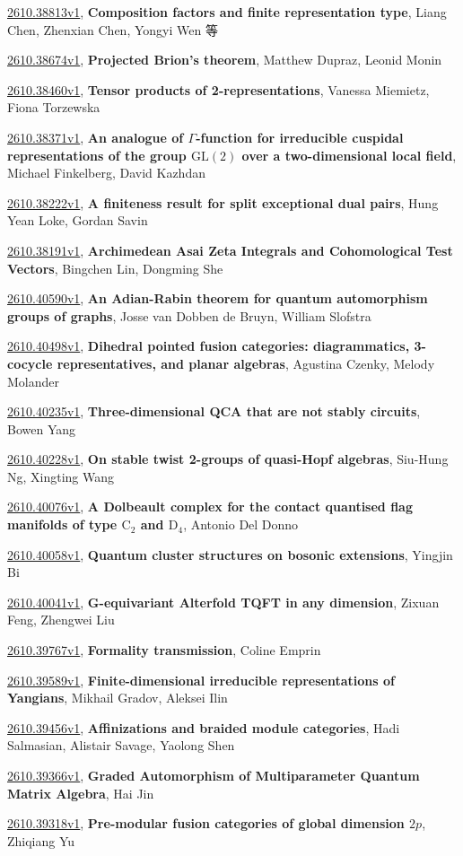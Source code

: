 \documentclass[9pt, a4paper]{article}
\theoremstyle{plain}
\theoremstyle{definition}
\theoremstyle{remark}
\newcommand{\arxiv}[3]{\href{https://arxiv.org/abs/#1}{#1}, \textbf{\textcolor{arxivblue}{#2}}, #3}
\begin{document}
\arxiv{2610.38813v1}{Composition factors and finite representation type}{Liang Chen, Zhenxian Chen, Yongyi Wen 等}

\arxiv{2610.38674v1}{Projected Brion's theorem}{Matthew Dupraz, Leonid Monin}

\arxiv{2610.38460v1}{Tensor products of 2-representations}{Vanessa Miemietz, Fiona Torzewska}

\arxiv{2610.38371v1}{An analogue of $Γ$-function for irreducible cuspidal representations of the group $\mathrm{GL}(2)$ over a two-dimensional local field}{Michael Finkelberg, David Kazhdan}

\arxiv{2610.38222v1}{A finiteness result for split exceptional dual pairs}{Hung Yean Loke, Gordan Savin}

\arxiv{2610.38191v1}{Archimedean Asai Zeta Integrals and Cohomological Test Vectors}{Bingchen Lin, Dongming She}

\arxiv{2610.40590v1}{An Adian-Rabin theorem for quantum automorphism groups of graphs}{Josse van Dobben de Bruyn, William Slofstra}

\arxiv{2610.40498v1}{Dihedral pointed fusion categories: diagrammatics, 3-cocycle representatives, and planar algebras}{Agustina Czenky, Melody Molander}

\arxiv{2610.40235v1}{Three-dimensional QCA that are not stably circuits}{Bowen Yang}

\arxiv{2610.40228v1}{On stable twist 2-groups of quasi-Hopf algebras}{Siu-Hung Ng, Xingting Wang}

\arxiv{2610.40076v1}{A Dolbeault complex for the contact quantised flag manifolds of type $\mathrm{C}_{2}$ and $\mathrm{D}_{4}$}{Antonio Del Donno}

\arxiv{2610.40058v1}{Quantum cluster structures on bosonic extensions}{Yingjin Bi}

\arxiv{2610.40041v1}{G-equivariant Alterfold TQFT in any dimension}{Zixuan Feng, Zhengwei Liu}

\arxiv{2610.39767v1}{Formality transmission}{Coline Emprin}

\arxiv{2610.39589v1}{Finite-dimensional irreducible representations of Yangians}{Mikhail Gradov, Aleksei Ilin}

\arxiv{2610.39456v1}{Affinizations and braided module categories}{Hadi Salmasian, Alistair Savage, Yaolong Shen}

\arxiv{2610.39366v1}{Graded Automorphism of Multiparameter Quantum Matrix Algebra}{Hai Jin}

\arxiv{2610.39318v1}{Pre-modular fusion categories of global dimension $2p$}{Zhiqiang Yu}
\end{document}
